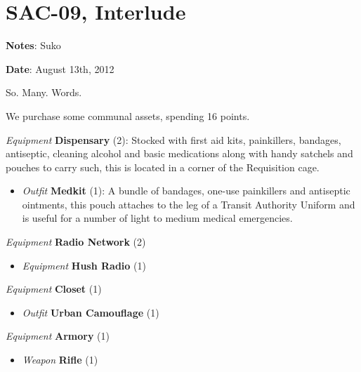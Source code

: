 \setcounter{chapter}{ 4 }
\chapter{\textbf{SAC-09, Interlude} }






\textbf{Notes}: Suko

\textbf{Date}: August 13th, 2012



So.  Many.  Words.



\noindent\hrulefill





We purchase some communal assets, spending 16 points.



\textit{Equipment} \textbf{Dispensary }(2): Stocked with first aid kits, painkillers, bandages, antiseptic, cleaning alcohol and basic medications along with handy satchels and pouches to carry such, this is located in a corner of the Requisition cage.

\begin{itemize}
\item \textit{Outfit} \textbf{Medkit} (1): A bundle of bandages, one-use painkillers and antiseptic ointments, this pouch attaches to the leg of a Transit Authority Uniform and is useful for a number of light to medium medical emergencies.
\end{itemize}



\textit{Equipment} \textbf{Radio Network }(2)

\begin{itemize}
\item \textit{Equipment} \textbf{Hush Radio} (1)
\end{itemize}



\textit{Equipment} \textbf{Closet }(1)

\begin{itemize}
\item \textit{Outfit} \textbf{Urban Camouflage} (1)
\end{itemize}



\textit{Equipment} \textbf{Armory }(1)

\begin{itemize}
\item \textit{Weapon} \textbf{Rifle} (1)
\end{itemize}





